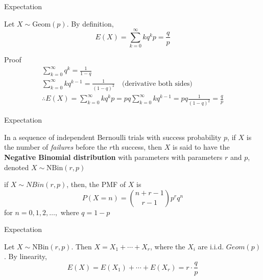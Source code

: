 \documentclass[8pt]{beamer}
\newcommand{\tb}[1]{\textbf{#1}}
\newcommand{\ti}[1]{\textit{#1}}
\begin{document}
\begin{frame}{Expectation}
    \begin{example} \label{ex:geometric_expectation}
        Let $X \sim \text{Geom}(p)$. By definition,
        \[
            E(X) = \sum^\infty_{k=0} k q ^k p = \frac{q}{p}
        \]
    \end{example}
    \begin{block}{Proof}
        \[
            \begin{gathered}
                \sum^\infty_{k=0} q^k = \frac{1}{1-q}\\
                \sum^{\infty}_{k=0} kq^{k-1} =\frac{1}{(1-q)^2}\quad \text{(derivative both sides)}\\
                \therefore E(X) = \sum^{\infty}_{k=0} k q^k p = pq \sum^\infty_{k=0} k q^{k-1} = pq \frac{1}{(1-q)^2} = \frac{q}{p}
            \end{gathered}
        \]
    \end{block}
\end{frame}

\begin{frame}{Expectation}
    \begin{definition}
        In a sequence of independent Bernoulli trials with success probability $p$, if $X$ is the number of \ti{failures} before the $r$th success, then $X$ is said to have the \tb{Negative Binomial distribution} with parameters with parameters $r$ and $p$, denoted $X \sim \text{NBin}(r, p)$\newline

        if $X \sim NBin(r,p)$, then, the PMF of $X$ is
        \[
            P(X=n) = \binom{n+r-1}{r-1} p^r q^n
        \]
        for $n=0,1,2, \dots, $ where $q=1-p$
    \end{definition}
\end{frame}

\begin{frame}{Expectation}
    \begin{example}
        Let $X \sim \text{NBin}(r,p)$. Then $X = X_1 + \cdots + X_r$, where the $X_i$ are i.i.d. $Geom(p)$. By linearity, 
        \[
            E(X) = E(X_1) + \cdots + E(X_r) = r \cdot \frac{q}{p}
        \]
    \end{example}
\end{frame}
\end{document}

